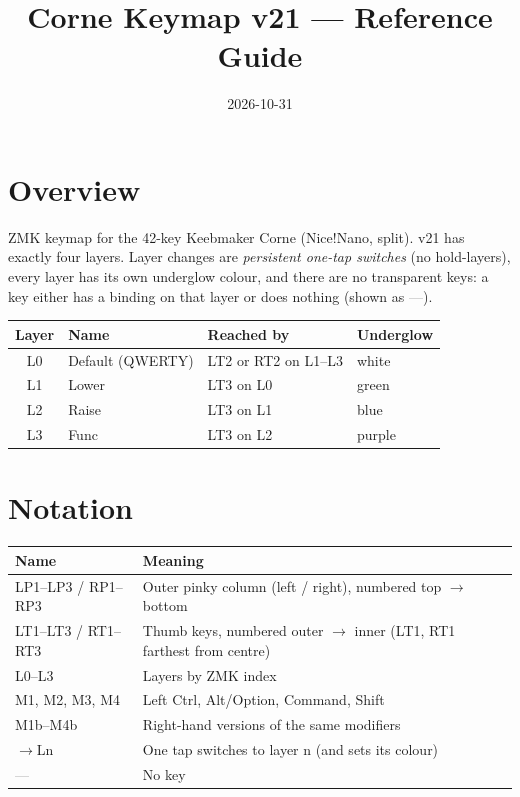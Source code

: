 \documentclass[11pt, letterpaper]{article}
\title{\textbf{Corne Keymap v21 --- Reference Guide}}
\author{}
\date{2026-10-31}
\newcommand{\nk}{\textcolor{gray}{---}}  %
\newcommand{\gl}[1]{$\to$L#1}            %
\begin{document}
\maketitle
\tableofcontents
\newpage

\section{Overview}

ZMK keymap for the 42-key Keebmaker Corne (Nice!Nano, split). v21 has
exactly four layers. Layer changes are \emph{persistent one-tap switches}
(no hold-layers), every layer has its own underglow colour, and there are
no transparent keys: a key either has a binding on that layer or does
nothing (shown as \nk).

\begin{center}
\begin{tabular}{clll}
\toprule
\textbf{Layer} & \textbf{Name} & \textbf{Reached by} & \textbf{Underglow} \\
\midrule
L0 & Default (QWERTY) & LT2 or RT2 on L1--L3 & white \\
L1 & Lower  & LT3 on L0 & green \\
L2 & Raise  & LT3 on L1 & blue \\
L3 & Func   & LT3 on L2 & purple \\
\bottomrule
\end{tabular}
\end{center}

\section{Notation}

\begin{tabular}{lp{11cm}}
\toprule
\textbf{Name} & \textbf{Meaning} \\
\midrule
LP1--LP3 / RP1--RP3 & Outer pinky column (left / right), numbered top $\to$ bottom \\
LT1--LT3 / RT1--RT3 & Thumb keys, numbered outer $\to$ inner (LT1, RT1 farthest from centre) \\
L0--L3 & Layers by ZMK index \\
M1, M2, M3, M4 & Left Ctrl, Alt/Option, Command, Shift \\
M1b--M4b & Right-hand versions of the same modifiers \\
\gl{n} & One tap switches to layer n (and sets its colour) \\
\nk & No key \\
\bottomrule
\end{tabular}
\end{document}
